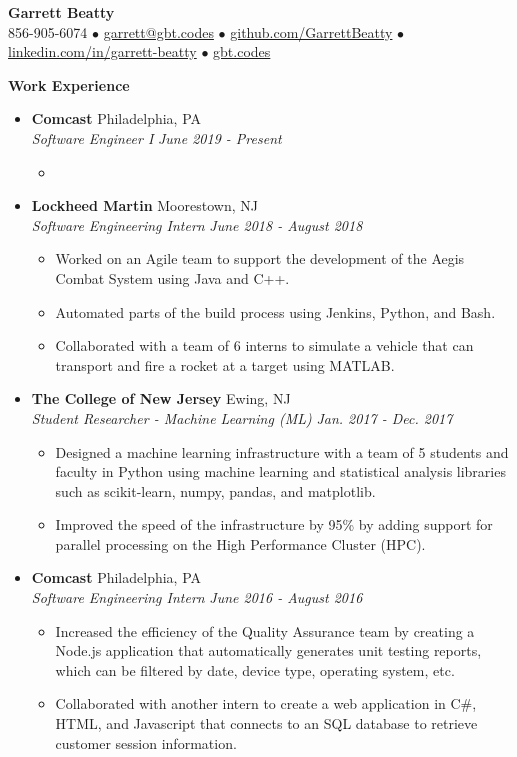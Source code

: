 \documentclass[letterpaper,10pt]{article}
\newcommand{\resitem}[1]{\item #1 \vspace{-2pt}}
\newcommand{\resheading}[1]{{\large \colorbox{mygrey}{\begin{minipage}{\textwidth}{\textbf{#1 \vphantom{p\^{E}}}}\end{minipage}}}}
\newcommand{\ressubheading}[4]{%
  \item\textbf{#1} \hfill #2\null\\
  \textit{#3} \hfill \textit{#4}%
  \vspace{-5pt}
}%
\begin{document}
\begin{center}
\textbf{\Huge Garrett Beatty} \\
\vspace{0.05in}
856-905-6074 $\bullet$ \href{mailto:garrett@gbt.codes}{garrett@gbt.codes} $\bullet$ \href{http://github.com/GarrettBeatty}{github.com/GarrettBeatty} $\bullet$ \href{http://linkedin.com/in/garrett-beatty}{linkedin.com/in/garrett-beatty} $\bullet$ \href{https://gbt.codes}{gbt.codes}
\end{center}

\vspace{-0.05in}

\resheading{Work Experience}
\begin{itemize}

\ressubheading{Comcast}{Philadelphia, PA}{Software Engineer I}{June 2019 - Present}
	\begin{itemize}
		\resitem{}
\end{itemize}


\ressubheading{Lockheed Martin}{Moorestown, NJ}{Software Engineering Intern}{June 2018 - August 2018}
	\begin{itemize}
		\resitem{Worked on an Agile team to support the development of the Aegis Combat System using Java and C++.}
		\resitem{Automated parts of the build process using Jenkins, Python, and Bash.}
		\resitem{Collaborated with a team of 6 interns to simulate a vehicle that can transport and fire a rocket at a target using MATLAB.}
	\end{itemize}	

\ressubheading{The College of New Jersey}{Ewing, NJ}{Student Researcher - Machine Learning (ML)}{Jan. 2017 - Dec. 2017}
	\begin{itemize}
		\resitem{Designed a machine learning infrastructure with a team of 5 students and faculty in Python using machine learning and statistical analysis libraries such as scikit-learn, numpy, pandas, and matplotlib.}
		\resitem{Improved the speed of the infrastructure by 95\% by adding support for parallel processing on the High Performance Cluster (HPC).}
		\end{itemize}

\ressubheading{Comcast}{Philadelphia, PA}{Software Engineering Intern}{June 2016 - August 2016}
	\begin{itemize}
		\resitem{Increased the efficiency of the Quality Assurance team by creating a Node.js application that automatically generates unit testing reports, which can be filtered by date, device type, operating system, etc.}
		\resitem{Collaborated with another intern to create a web application in C\#, HTML, and Javascript that connects to an SQL database to retrieve customer session information.}
	\end{itemize}
\end{itemize}
\end{document}
